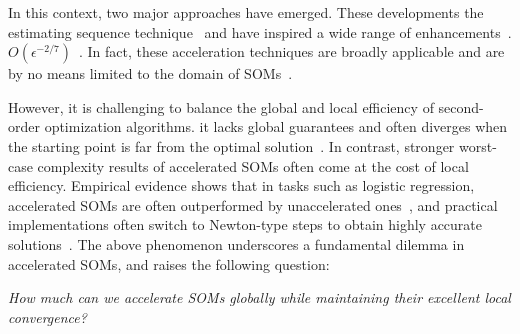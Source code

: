 \documentclass[moor,sglanonrev]{informs4}
\begin{document}
In this context, two major approaches have emerged. 
These developments  the estimating sequence technique~\cite{nesterov1983method,baes2009estimate} and have inspired a wide range of enhancements~\cite{jiang2021optimal,chen2022accelerating,lin2022explicit,agafonov2023inexact,agafonov2024advancing,jiang2024accelerated,huang2024inexact,doikov2020contracting}.
 $O(\epsilon^{-2/7})$~\cite{carmon2022optimal,kovalev2022first}. In fact, these acceleration techniques are broadly applicable and are by no means limited to the domain of SOMs~\cite{xu2017accelerated,xu2018accelerated,lan2012optimal,ghadimi2016accelerated}.


However, it is challenging to balance the global and local efficiency of second-order optimization algorithms.  it lacks global guarantees and often diverges when the starting point is far from the optimal solution~\cite{more1982newton,dennisjr1996numerical}. In contrast, stronger worst-case complexity results of accelerated SOMs often come at the cost of local efficiency.
Empirical evidence shows that in tasks such as logistic regression, accelerated SOMs are often outperformed by unaccelerated ones~\cite{jiang2020unified,huang2024inexact,chen2022accelerating,carmon2022optimal}, and practical implementations often switch to Newton-type steps to obtain highly accurate solutions~\cite{jiang2020unified,huang2024inexact,chen2022accelerating}. The above phenomenon underscores a fundamental dilemma in accelerated SOMs, and raises the following question:
\begin{center}
    \emph{How much can we accelerate SOMs globally while maintaining their excellent local convergence?}
\end{center}
\end{document}
